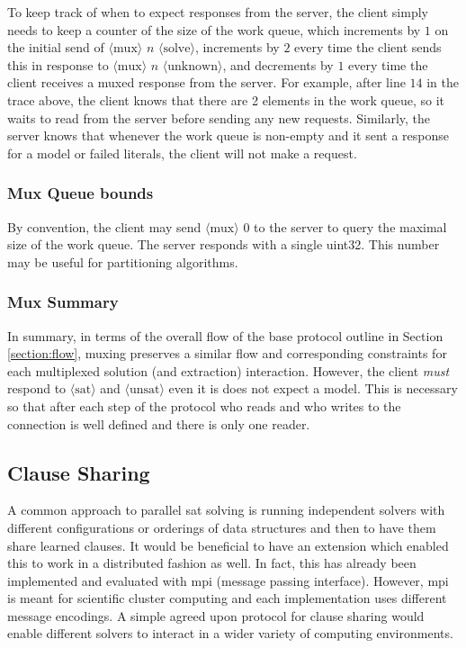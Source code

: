 \documentclass{article}
\newcommand\proto[1]{$\langle\mbox{#1}\rangle$}
\begin{document}
To keep track of when to expect responses from the server, the client simply
needs to keep a counter of the size of the work queue, which increments by $1$
on the initial send of \proto{mux} $n$ \proto{solve}, increments by $2$ every
time the client sends this in response to \proto{mux} $n$ \proto{unknown}, and
decrements by $1$ every time the client receives a muxed response from the
server.  For example, after line $14$ in the trace above, the client knows
that there are 2 elements in the work queue, so it waits to read from the server
before sending any new requests.  Similarly, the server knows that whenever the
work queue is non-empty and it sent a response for a model or failed literals,
the client will not make a request.

\subsubsection{Mux Queue bounds}
By convention, the client may send \proto{mux} $0$ to the server to query
the maximal size of the work queue.  The server responds with a single uint32.
This number may be useful for partitioning algorithms.

\subsubsection{Mux Summary}
In summary, in terms of the overall flow of the base protocol outline in
Section \ref{section:flow}, muxing preserves a similar flow and corresponding
constraints for each multiplexed solution (and extraction) interaction.
However, the client {\em must} respond to \proto{sat} and \proto{unsat} even it
is does not expect a model.  This is necessary so that after each step of the
protocol who reads and who writes to the connection is well defined and there
is only one reader.

\subsection{Clause Sharing}
A common approach to parallel sat solving is running independent solvers with
different configurations or orderings of data structures and then to have them
share learned clauses.  It would be beneficial to have an extension which
enabled this to work in a distributed fashion as well.  In fact, this has
already been implemented and evaluated with mpi (message passing interface).
However, mpi is meant for scientific cluster computing and each implementation
uses different message encodings.  A simple agreed upon protocol for clause
sharing would enable different solvers to interact in a wider variety of
computing environments. 
\end{document}
